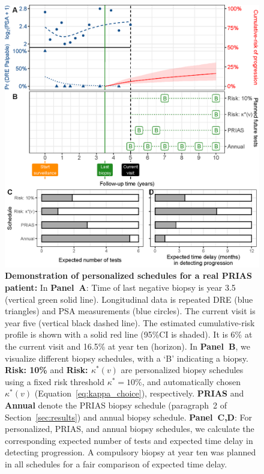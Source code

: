 \begin{figure}
\centerline{\includegraphics{images/demo_schedule.eps}}
\caption{\textbf{Demonstration of personalized schedules for a real PRIAS patient:} In \textbf{Panel~A}: Time of last negative biopsy is year 3.5 (vertical green solid line). Longitudinal data is repeated DRE (blue triangles) and PSA measurements (blue circles). The current visit is year five (vertical black dashed line). The estimated cumulative-risk profile is shown with a solid red line (95\%CI is shaded). It is 6\% at the current visit and 16.5\% at year ten (horizon). In \textbf{Panel~B}, we visualize different biopsy schedules, with a `B' indicating a biopsy. \textbf{Risk: 10\%} and \textbf{Risk: $\kappa^*(v)$} are personalized biopsy schedules using a fixed risk threshold $\kappa^*=10\%$, and automatically chosen $\kappa^*(v)$ (Equation~\ref{eq:kappa_choice}), respectively. \textbf{PRIAS} and \textbf{Annual} denote the PRIAS biopsy schedule (paragraph~2 of Section~\ref{sec:results}) and annual biopsy schedule. \textbf{Panel~C,D}: For personalized, PRIAS, and annual biopsy schedules, we calculate the corresponding expected number of tests and expected time delay in detecting progression. A compulsory biopsy at year ten was planned in all schedules for a fair comparison of expected time delay.}\label{fig:demo_schedule}
\end{figure}